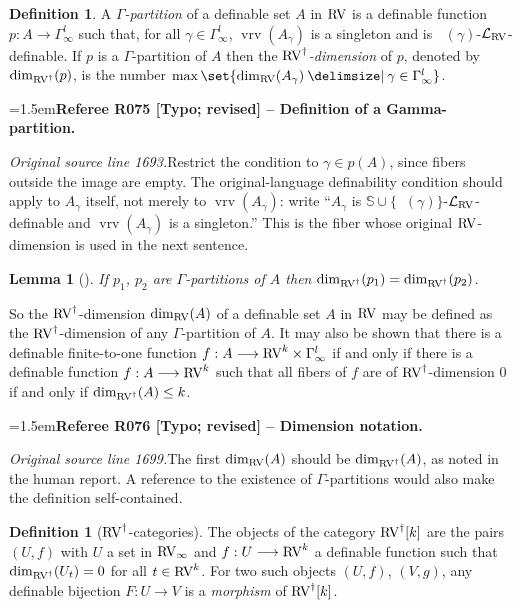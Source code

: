 \documentclass[12pt]{amsart}
\newcommand{\RefereeRemark}[4]{%
  \par\medskip\begingroup\normalfont\small\color{RefereePurple}%
  \emergencystretch=1.5em\noindent\textbf{Referee R#1 [#2] -- #3.}\par\nobreak\noindent #4\par
  \endgroup\medskip
}
\newcommand{\memph}[1]{{\color{magenta}\emph{#1}}}
\theoremstyle{plain}
\newtheorem{lem}[thm]{Lemma}
\theoremstyle{definition}
\newtheorem{defn}[thm]{Definition}
\theoremstyle{remark}
\numberwithin{equation}{section}
\theoremstyle{plain}
\newcommand{\RV}{\textup{RV}}
\newcommand{\0}{\emptyset}
\newcommand{\lan}[3]{\mathcal{L}_{#1 \textup{#2} #3}}
\newcommand{\fun}{\longrightarrow}
\providecommand\given{}
\newcommand\SetSymbol[1][]{%
\nonscript \: #1 \vert
\allowbreak
\nonscript\:
\mathopen{}}
\renewcommand\given{\SetSymbol[\delimsize]}
\DeclareMathOperator{\rcsn}{\overline {csn}}
\DeclareMathOperator{\vrv}{vrv}
\begin{document}
\begin{defn}
A \memph{$\Gamma$-partition} of a definable set $A$ in $\RV$ is a definable function $p : A \fun \Gamma_{\infty}^l$ such that, for all $\gamma \in \Gamma_{\infty}^l$, $\vrv(A_{\gamma})$ is a singleton and is $\rcsn(\gamma)$-$\lan{}{RV}{}$-definable. If $p$ is a $\Gamma$-partition of $A$ then the \memph{$\RV^\dag$-dimension} of $p$, denoted by $\dim_{\RV^\dag} (p)$, is the number $\max \set{\dim_{\RV} (A_{\gamma}) \given \gamma \in \Gamma_{\infty}^{l} }$.
\end{defn}

\RefereeRemark{075}{Typo; revised}{Definition of a Gamma-partition}{%
\textit{Original source line 1693.}\quad Restrict the condition to $\gamma\in p(A)$, since fibers outside the image are empty. The original-language definability condition should apply to $A_\gamma$ itself, not merely to $\vrv(A_\gamma)$: write ``$A_\gamma$ is $\mathbb S\cup\{\rcsn(\gamma)\}$-$\lan{}{RV}{}$-definable and $\vrv(A_\gamma)$ is a singleton.'' This is the fiber whose original $\RV$-dimension is used in the next sentence.
}

\begin{lem}[{\cite[Lemma~3.2]{Yin:int:expan:acvf}}]\label{G:part:dim:inv}
If $p_1$, $p_2$ are $\Gamma$-partitions of $A$ then  $\dim_{\RV^\dag} (p_1) = \dim_{\RV^\dag} (p_2)$.
\end{lem}

So the $\RV^\dag$-dimension $\dim_{\RV}(A)$ of a definable set $A$ in  $\RV$ may be defined as the $\RV^\dag$-dimension of any $\Gamma$-partition of $A$. It may also be shown that there is a definable finite-to-one function $f : A \fun \RV^k \times \Gamma_{\infty}^l$ if and only if there is a definable function $f : A \fun \RV^k$ such that all fibers of $f$ are of $\RV^\dag$-dimension $0$ if and only if $\dim_{\RV^\dag}(A) \leq k$.

\RefereeRemark{076}{Typo; revised}{Dimension notation}{%
\textit{Original source line 1699.}\quad The first $\dim_{\RV}(A)$ should be $\dim_{\RV^\dag}(A)$, as noted in the human report. A reference to the existence of $\Gamma$-partitions would also make the definition self-contained.
}

\begin{defn}[$\RV^\dag$-categories]\label{defn:f:RV:cat}
The objects of the category $\RV^\dag[k]$ are the pairs $(U, f)$ with $U$ a set in $\RV_\infty$ and $f : U \fun \RV^k$ a definable function such that $\dim_{\RV^\dag}(U_t) = 0$ for all $t \in \RV^k$. For two such objects $(U, f)$, $(V, g)$, any definable bijection $F : U \fun V$ is a \memph{morphism} of $\RV^\dag[k]$.
\end{defn}
\end{document}
